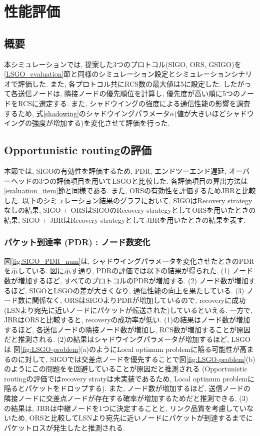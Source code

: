 \documentclass[10pt]{jreport}
\begin{document}
\chapter{性能評価}
\label{Evaluation}
\section{概要}
本シミュレーションでは, 提案した3つのプロトコル(SIGO, ORS, GSIGO)を\ref{LSGO_evaluation}節と同様のシミュレーション設定とシミュレーションシナリオで評価した. また, 各プロトコル共にRCS数の最大値は5に設定した. したがって各送信ノードは, 隣接ノードの優先順位を計算し, 優先度が高い順に5つのノードをRCSに選定する. また, シャドウイングの強度による通信性能の影響を調査するため, 式\ref{shadowing}のシャドウイングパラメータ$\alpha$(値が大きいほどシャドウイングの強度が増加する)を変化させて評価を行った. 


\section{Opportunistic routingの評価}
\label{SIGO_evaluation}
本節では, SIGOの有効性を評価するため, PDR, エンドツーエンド遅延, オーバーヘッドの3つの評価項目を用いてLSGOと比較した.
各評価項目の算出方法は\ref{evaluation_item}節と同様である. また, ORSの有効性を評価するためJBRと比較した. 以下のシミュレーション結果のグラフにおいて, SIGOはRecovery strategyなしの結果, SIGO + ORSはSIGOのRecovery strategyとしてORSを用いたときの結果, SIGO + JBRはRecovery strategyとしてJBRを用いたときの結果を表す. 

\subsection{パケット到達率 (PDR) : ノード数変化}

図\ref{fig:SIGO_PDR_num}は, シャドウイングパラメータを変化させたときのPDRを示している.
図に示す通り, PDRの評価では以下の結果が得られた.
(1) ノード数が増加するほど, すべてのプロトコルのPDRが増加する. 
(2) ノード数が増加するほど, SIGOとLSGOの差が大きくなり, 通信性能の向上を果たしている.
(3) ノード数に関係なく, ORSはSIGOよりPDRが増加しているので, recoveryに成功(LSNより宛先に近いノードにパケットが転送された)しているといえる. 一方で, JBRはORSと比較すると, recoveryの成功率が低い. 
(1)の結果はノード数が増加するほど, 各送信ノードの隣接ノード数が増加し, RCS数が増加することが原因だと推測される.
(2)の結果はシャドウイングパラメータが増加するほど, LSGOは 図\ref{fig:LSGO-problem}(a)のようにLocal optimum problemに陥る可能性が高まるのに対して, SIGOでは交差点ノードを優先することで図\ref{fig:LSGO-problem}(b)のようにこの問題をを回避していることが原因だと推測される (Opportunistic routingの評価ではrecovery stratyは未実装であるため, Local optimum problemに陥るとパケットをドロップする). また, ノード数が増加するほど, 送信ノードの隣接ノードに交差点ノードが存在する確率が増加するためだと推測できる.
(3) の結果は, JBRは中継ノードを1つに決定することと, リンク品質を考慮していないため, ORSと比較してLSNより宛先に近いノードにパケットが到達するまでにパケットロスが発生したと推測される. 
\end{document}
